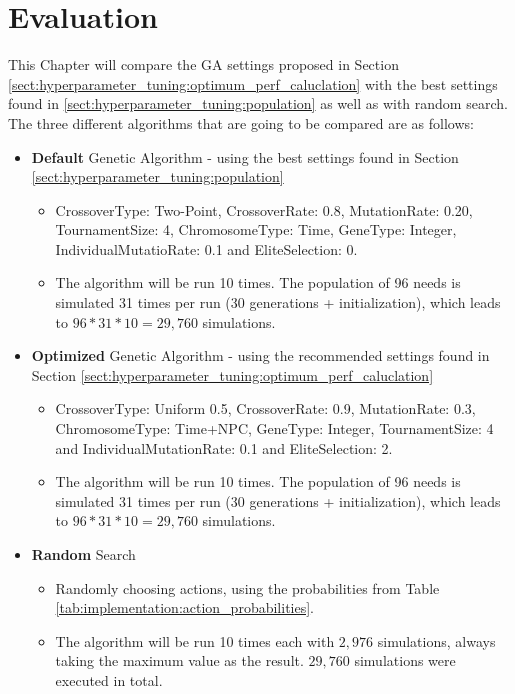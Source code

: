 \chapter{Evaluation}
\label{chap:evaluation}
This Chapter will compare the GA settings proposed in Section \ref{sect:hyperparameter_tuning:optimum_perf_caluclation} with the best settings found in \ref{sect:hyperparameter_tuning:population} as well as with random search. The three different algorithms that are going to be compared are as follows:
\begin{itemize}
	\item \textbf{Default} Genetic Algorithm - using the best settings found in Section \ref{sect:hyperparameter_tuning:population}
	\begin{itemize}
		\item CrossoverType: Two-Point, CrossoverRate: 0.8, MutationRate: 0.20, TournamentSize: 4, ChromosomeType: Time, GeneType: Integer, IndividualMutatioRate: 0.1 and EliteSelection: 0. 
		\item The algorithm will be run 10 times. The population of 96 needs is simulated 31 times per run (30 generations + initialization), which leads to $96 * 31 * 10 = 29,760$ simulations.
	\end{itemize}
	\item \textbf{Optimized} Genetic Algorithm - using the recommended settings found in Section \ref{sect:hyperparameter_tuning:optimum_perf_caluclation}
	\begin{itemize}
		\item CrossoverType: Uniform 0.5, CrossoverRate: 0.9, MutationRate: 0.3, ChromosomeType: Time+NPC, GeneType: Integer, TournamentSize: 4 and IndividualMutationRate: 0.1 and EliteSelection: 2. 
		\item The algorithm will be run 10 times. The population of 96 needs is simulated 31 times per run (30 generations + initialization), which leads to $96 * 31 * 10 = 29,760$ simulations.
	\end{itemize}
	\item \textbf{Random} Search
	\begin{itemize}
		\item Randomly choosing actions, using the probabilities from Table \ref{tab:implementation:action_probabilities}. 
		\item The algorithm will be run 10 times each with $2,976$ simulations, always taking the maximum value as the result. $29,760$ simulations were executed in total.
	\end{itemize}
\end{itemize}



